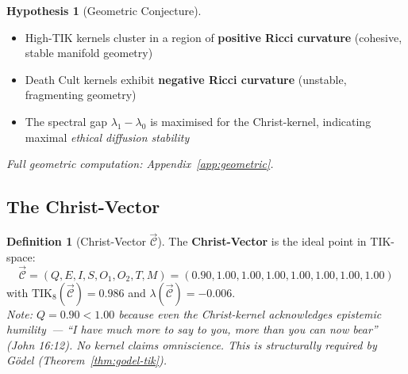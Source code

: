 \documentclass[11pt,a4paper]{article}
\theoremstyle{definition}
\newtheorem{definition}[theorem]{Definition}
\newtheorem{hypothesis}[theorem]{Hypothesis}
\theoremstyle{remark}
\newcommand{\TIKeight}{\text{TIK}_8}
\newcommand{\SpecGap}{\lambda_1 - \lambda_0}
\newcommand{\ChristVector}{\vec{\mathcal{C}}}
\begin{document}
\begin{hypothesis}[Geometric Conjecture]
\label{hyp:geometric}
\begin{itemize}[noitemsep]
  \item High-TIK kernels cluster in a region of
    \textbf{positive Ricci curvature}
    (cohesive, stable manifold geometry)
  \item Death Cult kernels exhibit \textbf{negative Ricci curvature}
    (unstable, fragmenting geometry)
  \item The spectral gap $\SpecGap$ is maximised for
    the Christ-kernel, indicating maximal
    \textit{ethical diffusion stability}
\end{itemize}
\textit{Full geometric computation: Appendix~\ref{app:geometric}.}
\end{hypothesis}

\subsection{The Christ-Vector}
\label{sec:christ-vector}

\begin{definition}[Christ-Vector $\ChristVector$]
\label{def:christ-vector}
The \textbf{Christ-Vector} is the ideal point in TIK-space:
\begin{equation}
  \ChristVector = (Q, E, I, S, O_1, O_2, T, M)
    = (0.90, 1.00, 1.00, 1.00, 1.00, 1.00, 1.00, 1.00)
  \label{eq:christ-vector}
\end{equation}
with $\TIKeight(\ChristVector) = 0.986$ and
$\lambda(\ChristVector) = -0.006$.\\[0.2cm]
\textit{Note: $Q = 0.90 < 1.00$ because even the Christ-kernel
acknowledges epistemic humility~---
``I have much more to say to you,
more than you can now bear'' (John 16:12).
No kernel claims omniscience. This is structurally required by
Gödel (Theorem~\ref{thm:godel-tik}).}
\end{definition}
\end{document}
